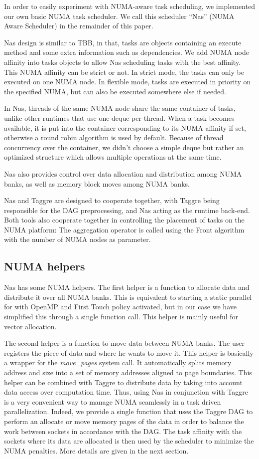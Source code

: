 In order to easily experiment with NUMA-aware task scheduling, we
implemented our own basic NUMA task scheduler. We call this scheduler
``Nas'' (NUMA Aware Scheduler) in the remainder of this paper. 

Nas design is similar to TBB, in that, tasks are objects containing an execute
method and some extra information such as dependencies.
We add NUMA node affinity into tasks objects to allow Nas scheduling
tasks with the best affinity. This NUMA affinity can be strict or not.
In strict mode, the tasks can only be executed on one NUMA node. In flexible
mode, tasks are executed in priority on the specified NUMA, but can also be
executed somewhere else if needed.

In Nas, threads of the same NUMA node share the same container of tasks, unlike
other runtimes that use one deque per thread. When a
task becomes available, it is put into the container corresponding to
its NUMA affinity if set,
otherwise a round robin algorithm is used by default. Because of thread concurrency
over the container, we didn't choose a simple deque but rather an optimized
structure which allows multiple operations at the same time.

Nas also provides control over data allocation and distribution
among NUMA banks, as well as memory block moves among NUMA banks.

Nas and Taggre are designed to cooperate together, with Taggre being
responsible for the DAG preprocessing, and Nas acting as the
runtime back-end. Both tools also cooperate together in controlling the placement of
tasks on the NUMA platform: The aggregation operator is called using
the Front algorithm with the number of NUMA nodes as parameter.

\subsection{NUMA helpers}
\label{NUMA_helper}
Nas has some NUMA helpers. The first helper is a function to allocate data
and distribute it over all NUMA banks. This is equivalent to starting a static
parallel for with OpenMP and First Touch policy activated, but in our case we have simplified this through a single function call. 
This helper is mainly useful for vector allocation.

The second helper is a function to move data between NUMA banks. The user registers the piece
of data and where he wants to move it. This helper is basically a wrapper for
the {\em move\_pages} system call. It automatically splits memory address and size into
a set of memory addresses aligned to page boundaries. This helper can be combined with Taggre
to distribute data by taking into account data access over computation time.
Thus, using Nas in conjunction with Taggre is a very convenient way to manage NUMA seamlessly in a task driven parallelization. 
Indeed, we provide a single function that uses the Taggre DAG to perform
an allocate or move memory pages of the data in order to balance the
work between sockets in accordance with the DAG. 
The task affinity with the sockets where its data are allocated is then
used by the scheduler to minimize the NUMA penalties. More details are
given in the next section.

